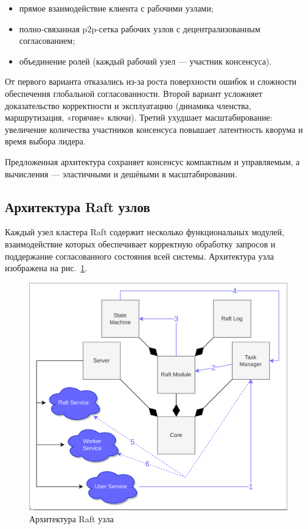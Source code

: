 \begin{itemize}
\item прямое взаимодействие клиента с рабочими узлами;
\item полно-связанная p2p-сетка рабочих узлов с децентрализованным согласованием;
\item объединение ролей (каждый рабочий узел — участник консенсуса).
\end{itemize}

От первого варианта отказались из-за роста поверхности ошибок и сложности
обеспечения глобальной согласованности. Второй вариант усложняет доказательство
корректности и эксплуатацию (динамика членства, маршрутизация, «горячие»
ключи). Третий ухудшает масштабирование: увеличение количества участников
консенсуса повышает латентность кворума и время выбора лидера.

Предложенная архитектура сохраняет консенсус компактным и управляемым, а
вычисления — эластичными и дешёвыми в масштабировании.

\subsection{Архитектура Raft узлов}

Каждый узел кластера Raft содержит несколько функциональных модулей,
взаимодействие которых обеспечивает корректную обработку запросов и поддержание
согласованного состояния всей системы. Архитектура узла изображена на
рис.~\ref{fig:raft-overview}.

\begin{figure}
  \centering
  \includegraphics[scale=0.25]{inc/raft-arch.png}
  \caption{Архитектура Raft узла}
  \label{fig:raft-overview}
\end{figure}

